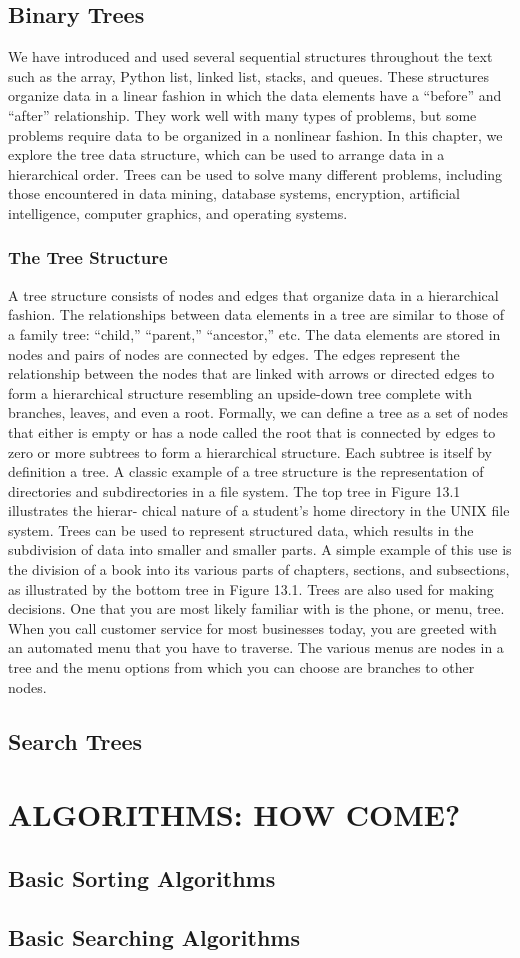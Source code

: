 \documentclass[12pt,a4paper,final,twoside,titlepage]{book}
\begin{document}
\chapter{Binary Trees}
We have introduced and used several sequential structures throughout the text such as the array, Python list, linked list, stacks, and queues. These structures organize data in a linear fashion in which the data elements have a “before” and “after” relationship. They work well with many types of problems, but some problems require data to be organized in a nonlinear fashion. In this chapter, we explore the tree data structure, which can be used to arrange data in a hierarchical order. Trees can be used to solve many different problems, including those encountered in data mining, database systems, encryption, artificial intelligence, computer graphics, and operating systems.

\section{The Tree Structure}
A tree structure consists of nodes and edges that organize data in a hierarchical fashion. The relationships between data elements in a tree are similar to those of a family tree: “child,” “parent,” “ancestor,” etc. The data elements are stored in nodes and pairs of nodes are connected by edges. The edges represent the relationship between the nodes that are linked with arrows or directed edges to form a hierarchical structure resembling an upside-down tree complete with branches, leaves, and even a root.
Formally, we can define a tree as a set of nodes that either is empty or has a node called the root that is connected by edges to zero or more subtrees to form a hierarchical structure. Each subtree is itself by definition a tree.
A classic example of a tree structure is the representation of directories and subdirectories in a file system. The top tree in Figure 13.1 illustrates the hierar- chical nature of a student’s home directory in the UNIX file system. Trees can be used to represent structured data, which results in the subdivision of data into smaller and smaller parts. A simple example of this use is the division of a book into its various parts of chapters, sections, and subsections, as illustrated by the bottom tree in Figure 13.1. Trees are also used for making decisions. One that you are most likely familiar with is the phone, or menu, tree. When you call customer service for most businesses today, you are greeted with an automated menu that you have to traverse. The various menus are nodes in a tree and the menu options from which you can choose are branches to other nodes.

\chapter{Search Trees}

\part{ALGORITHMS: HOW COME?}
\chapter{Basic Sorting Algorithms}
\chapter{Basic Searching Algorithms}



\end{document}
